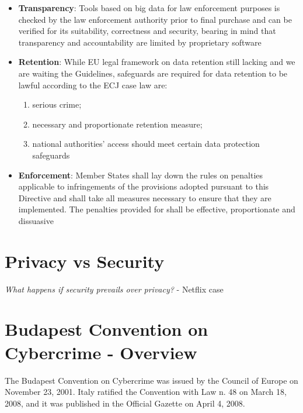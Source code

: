 \begin{itemize}[itemsep=0pt]
    \item \textbf{Transparency}: Tools based on big data for law enforcement purposes is checked by the law enforcement authority prior to final purchase and can be verified for its suitability, correctness and security, bearing in mind that transparency and accountability are limited by proprietary software
    \item \textbf{Retention}: While EU legal framework on data retention still lacking and we are waiting the Guidelines, safeguards are required for data retention to be lawful according to the ECJ case law are: 
    \begin{enumerate}[itemsep=0pt, label=\roman*.]
        \item serious crime;
        \item necessary and proportionate retention measure;
        \item national authorities’ access should meet certain data protection safeguards
    \end{enumerate}
    
    \item \textbf{Enforcement}: Member States shall lay down the rules on penalties applicable to infringements of the provisions adopted pursuant to this Directive and shall take all measures necessary to ensure that they are implemented. The penalties provided for shall be effective, proportionate and dissuasive
\end{itemize}

\section{Privacy vs Security}

\textit{What happens if security prevails over privacy?} - Netflix case

\section{Budapest Convention on Cybercrime - Overview}

The Budapest Convention on Cybercrime was issued by the Council of Europe on November 23, 2001.  
Italy ratified the Convention with Law n. 48 on March 18, 2008, and it was published in the Official Gazette on April 4, 2008.
